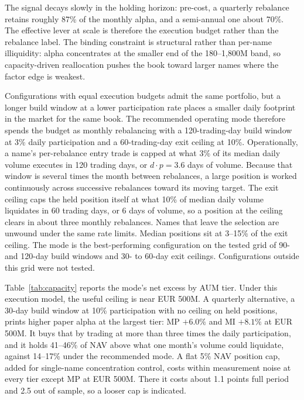 \documentclass[11pt,a4paper]{article}
\begin{document}
The signal decays slowly in the holding horizon: pre-cost, a quarterly
rebalance retains roughly 87\% of the monthly alpha, and a semi-annual one
about 70\%. The effective lever at scale is therefore the execution budget
rather than the rebalance label. The binding constraint is structural
rather than per-name illiquidity: alpha concentrates at the smaller end of
the 180--1{,}800M band, so capacity-driven reallocation pushes the book
toward larger names where the factor edge is weakest.

Configurations with equal execution budgets admit the same portfolio, but a
longer build window at a lower participation rate places a smaller daily
footprint in the market for the same book. The recommended operating mode
therefore spends the budget as monthly rebalancing with a 120-trading-day
build window at 3\% daily participation and a 60-trading-day exit ceiling
at 10\%. Operationally, a name's per-rebalance entry trade is capped at
what 3\% of its median daily volume executes in 120 trading days, or
$d \cdot p = 3.6$ days of volume. Because that window is several times the month between
rebalances, a large position is worked continuously across successive
rebalances toward its moving target. The exit ceiling caps the held
position itself at what 10\% of median daily volume liquidates in 60
trading days, or 6 days of volume, so a position at the ceiling clears in
about three monthly rebalances. Names that leave the selection are unwound
under the same rate limits. Median positions sit at 3--15\% of the exit
ceiling. The mode is the best-performing configuration on the tested grid
of 90- and 120-day build windows and 30- to 60-day exit ceilings.
Configurations outside this grid were not tested.

Table~\ref{tab:capacity} reports the mode's net excess by AUM tier. Under
this execution model, the useful ceiling is near EUR 500M. A quarterly alternative, a
30-day build window at 10\% participation with no ceiling on held
positions, prints higher paper alpha at the largest tier: MP $+6.0\%$ and
MI $+8.1\%$ at EUR 500M. It buys that by trading at more than three times
the daily participation, and it holds 41--46\% of NAV above what one
month's volume could liquidate, against 14--17\% under the recommended
mode. A flat 5\% NAV position cap, added for single-name concentration
control, costs within measurement noise at every tier except MP at EUR
500M. There it costs about 1.1 points full period and 2.5 out of sample,
so a looser cap is indicated.
\end{document}
